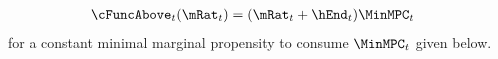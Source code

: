   \begin{equation}\begin{gathered}\begin{aligned}
    \cFuncAbove_{t}(\mRat_{t})  & = (\mRat_{t} + \hEnd_{t})\MinMPC_{t} \label{eq:cFuncAbove}
  \end{aligned}\end{gathered}\end{equation}
  for a constant minimal marginal propensity to consume $\MinMPC_{t}$ given below.

